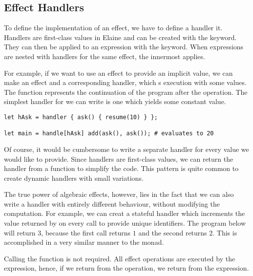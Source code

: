 \subsection{Effect Handlers}\label{sec:alghandlers}

To define the implementation of an effect, we have to define a handler it. Handlers are first-class values in Elaine and can be created with the  keyword. They can then be applied to an expression with the  keyword. When  expressions are nested with handlers for the same effect, the innermost  applies.

For example, if we want to use an effect to provide an implicit value, we can make an effect  and a corresponding handler, which s execution with some values. The  function represents the continuation of the program after the operation. The simplest handler for  we can write is one which yields some constant value.

\begin{lstlisting}[language=elaine,style=fancy]
let hAsk = handler { ask() { resume(10) } };

let main = handle[hAsk] add(ask(), ask()); # evaluates to 20
\end{lstlisting}

Of course, it would be cumbersome to write a separate handler for every value we would like to provide. Since handlers are first-class values, we can return the handler from a function to simplify the code. This pattern is quite common to create dynamic handlers with small variations.


The true power of algebraic effects, however, lies in the fact that we can also write a handler with entirely different behaviour, without modifying the computation. For example, we can creat a stateful handler which increments the value returned by  on every call to provide unique identifiers. The program below will return $3$, because the first  call returns $1$ and the second returns $2$. This is accomplished in a very similar manner to the  monad.


Calling the  function is not required. All effect operations are executed by the  expression, hence, if we return from the operation, we return from the  expression.

